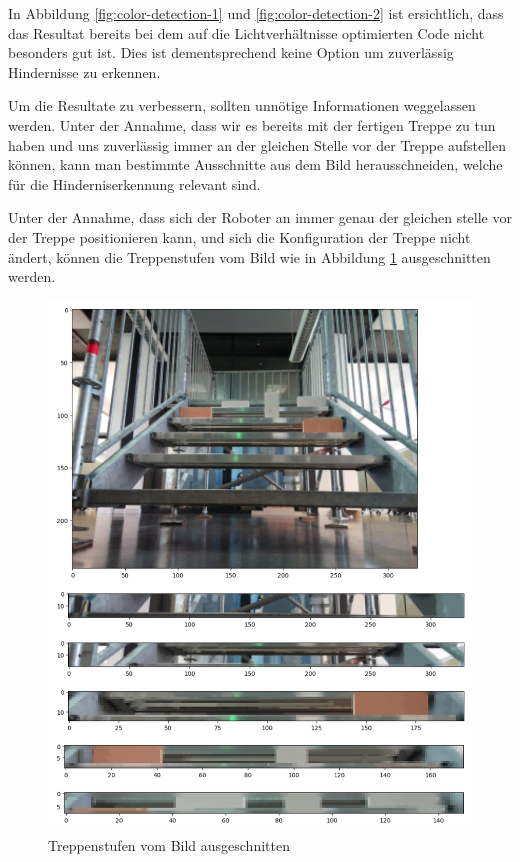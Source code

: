 In Abbildung \ref{fig:color-detection-1} und \ref{fig:color-detection-2} ist ersichtlich, dass das Resultat bereits bei dem auf die Lichtverhältnisse optimierten
Code nicht besonders gut ist. Dies ist dementsprechend keine Option um
zuverlässig Hindernisse zu erkennen.

Um die Resultate zu verbessern, sollten unnötige Informationen weggelassen werden.
Unter der Annahme, dass wir es bereits mit der fertigen Treppe zu tun haben
und uns zuverlässig immer an der gleichen Stelle vor der Treppe
aufstellen können, kann man bestimmte Ausschnitte aus dem Bild herausschneiden,
welche für die Hinderniserkennung relevant sind.

Unter der Annahme, dass sich der Roboter an immer genau der gleichen stelle vor der Treppe positionieren kann,
und sich die Konfiguration der Treppe nicht ändert, können die Treppenstufen vom Bild wie in Abbildung \ref{fig:extracted-stairs} ausgeschnitten werden.
\begin{figure}[H]
  \includegraphics[width=1.0\textwidth]{img/hinderniserkennung/extracted-stairs.png}
  \centering
  \caption{Treppenstufen vom Bild ausgeschnitten}
  \label{fig:extracted-stairs}
\end{figure}

